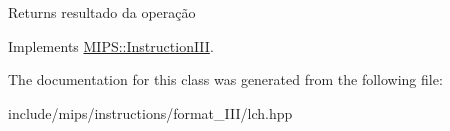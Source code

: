\begin{DoxyReturn}{Returns}
resultado da operação 
\end{DoxyReturn}


Implements \hyperlink{classMIPS_1_1InstructionIII_aee3071c23abc542e55b446abee766c5e}{M\+I\+P\+S\+::\+Instruction\+I\+II}.



The documentation for this class was generated from the following file\+:\begin{DoxyCompactItemize}
\item 
include/mips/instructions/format\+\_\+\+I\+I\+I/lch.\+hpp\end{DoxyCompactItemize}
